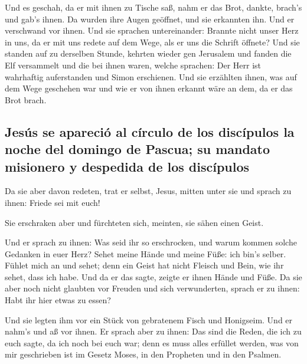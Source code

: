  Und es geschah, da er mit ihnen zu Tische saß, nahm er
das Brot, dankte, brach's und gab's ihnen.  Da wurden
ihre Augen geöffnet, und sie erkannten ihn. Und er verschwand vor ihnen.
 Und sie sprachen untereinander: Brannte nicht unser Herz
in uns, da er mit uns redete auf dem Wege, als er uns die Schrift
öffnete?  Und sie standen auf zu derselben Stunde,
kehrten wieder gen Jerusalem und fanden die Elf versammelt und die bei
ihnen waren,  welche sprachen: Der Herr ist wahrhaftig
auferstanden und Simon erschienen.  Und sie erzählten
ihnen, was auf dem Wege geschehen war und wie er von ihnen erkannt wäre
an dem, da er das Brot brach.

\hypertarget{jesuxfas-se-apareciuxf3-al-cuxedrculo-de-los-discuxedpulos-la-noche-del-domingo-de-pascua-su-mandato-misionero-y-despedida-de-los-discuxedpulos}{%
\subsection{Jesús se apareció al círculo de los discípulos la noche del
domingo de Pascua; su mandato misionero y despedida de los
discípulos}\label{jesuxfas-se-apareciuxf3-al-cuxedrculo-de-los-discuxedpulos-la-noche-del-domingo-de-pascua-su-mandato-misionero-y-despedida-de-los-discuxedpulos}}

 Da sie aber davon redeten, trat er selbst, Jesus, mitten
unter sie und sprach zu ihnen: Friede sei mit euch!

 Sie erschraken aber und fürchteten sich, meinten, sie
sähen einen Geist.

 Und er sprach zu ihnen: Was seid ihr so erschrocken, und
warum kommen solche Gedanken in euer Herz?  Sehet meine
Hände und meine Füße: ich bin's selber. Fühlet mich an und sehet; denn
ein Geist hat nicht Fleisch und Bein, wie ihr sehet, dass ich habe.
 Und da er das sagte, zeigte er ihnen Hände und Füße.
 Da sie aber noch nicht glaubten vor Freuden und sich
verwunderten, sprach er zu ihnen: Habt ihr hier etwas zu essen?

 Und sie legten ihm vor ein Stück von gebratenem Fisch
und Honigseim.  Und er nahm's und aß vor ihnen.
 Er sprach aber zu ihnen: Das sind die Reden, die ich zu
euch sagte, da ich noch bei euch war; denn es muss alles erfüllet
werden, was von mir geschrieben ist im Gesetz Moses, in den Propheten
und in den Psalmen.

